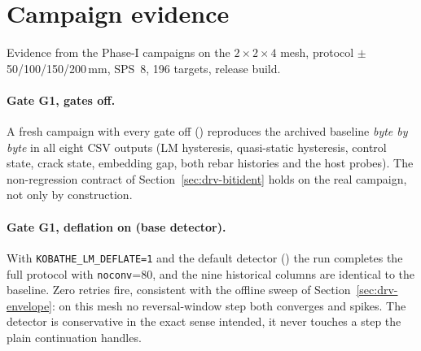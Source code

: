 \section{Campaign evidence}
\label{sec:drv-evidence}

Evidence from the Phase-I campaigns on the $2{\times}2{\times}4$ mesh,
protocol $\pm$50/100/150/200\,mm, SPS~8, 196 targets, release build.

\paragraph{Gate G1, gates off.}
A fresh campaign with every gate off
() reproduces the archived baseline
 \emph{byte by byte} in all eight CSV
outputs (LM hysteresis, quasi-static hysteresis, control state, crack
state, embedding gap, both rebar histories and the host probes). The
non-regression contract of Section~\ref{sec:drv-bitident} holds on the
real campaign, not only by construction.

\paragraph{Gate G1, deflation on (base detector).}
With \texttt{KOBATHE\_LM\_DEFLATE=1} and the default detector
() the run completes the full protocol
with \texttt{noconv}=80, and the nine historical columns are identical
to the baseline. Zero retries fire, consistent with the offline sweep of
Section~\ref{sec:drv-envelope}: on this mesh no reversal-window step
both converges and spikes. The detector is conservative in the exact
sense intended, it never touches a step the plain continuation handles.

